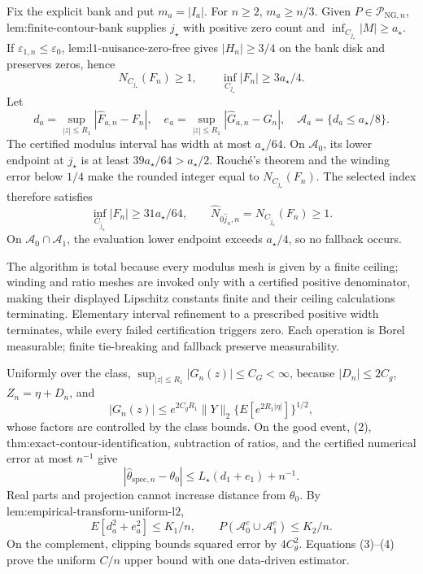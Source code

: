 Fix the explicit bank and put \(m_a=|I_a|\).  For \(n\ge2\), \(m_a\ge n/3\).  Given \(P\in\mathcal P_{\mathrm{NG},n}\), \(\text{lem:finite-contour-bank}\) supplies \(j_\star\) with positive zero count and \(\inf_{C_{j_\star}}|M|\ge a_\star\).  If \(\varepsilon_{1,n}\le\varepsilon_0\), \(\text{lem:l1-nuisance-zero-free}\) gives \(|H_n|\ge3/4\) on the bank disk and preserves zeros, hence
\[
 N_{C_{j_\star}}(F_n)\ge1,
 \qquad \inf_{C_{j_\star}}|F_n|\ge3a_\star/4. \tag{1}
\]
Let
\[
 d_a=\sup_{|z|\le R_1}|\widehat F_{a,n}-F_n|,
 \quad e_a=\sup_{|z|\le R_1}|\widehat G_{a,n}-G_n|,
 \quad \mathcal A_a=\{d_a\le a_\star/8\}.
\]
The certified modulus interval has width at most \(a_\star/64\).  On \(\mathcal A_0\), its lower endpoint at \(j_\star\) is at least \(39a_\star/64>a_\star/2\).  Rouch\'e's theorem and the winding error below \(1/4\) make the rounded integer equal to \(N_{C_{j_\star}}(F_n)\).  The selected index therefore satisfies
\[
 \inf_{C_{\widehat j_n}}|F_n|\ge31a_\star/64,
 \qquad \widehat N_{0\widehat j_n,n}=N_{C_{\widehat j_n}}(F_n)\ge1. \tag{2}
\]
On \(\mathcal A_0\cap\mathcal A_1\), the evaluation lower endpoint exceeds \(a_\star/4\), so no fallback occurs.

The algorithm is total because every modulus mesh is given by a finite ceiling; winding and ratio meshes are invoked only with a certified positive denominator, making their displayed Lipschitz constants finite and their ceiling calculations terminating.  Elementary interval refinement to a prescribed positive width terminates, while every failed certification triggers zero.  Each operation is Borel measurable; finite tie-breaking and fallback preserve measurability.

Uniformly over the class, \(\sup_{|z|\le R_1}|G_n(z)|\le C_G<\infty\), because \(|D_n|\le2C_g\), \(Z_n=\eta+D_n\), and
\[
 |G_n(z)|\le e^{2C_gR_1}\|Y\|_2\{E[e^{2R_1|\eta|}]\}^{1/2},
\]
whose factors are controlled by the class bounds.  On the good event, (2), \(\text{thm:exact-contour-identification}\), subtraction of ratios, and the certified numerical error at most \(n^{-1}\) give
\[
 |\widehat\theta_{\mathrm{spec},n}-\theta_0|
 \le L_\star(d_1+e_1)+n^{-1}. \tag{3}
\]
Real parts and projection cannot increase distance from \(\theta_0\).  By \(\text{lem:empirical-transform-uniform-l2}\),
\[
 E[d_a^2+e_a^2]\le K_1/n,
 \qquad P(\mathcal A_0^c\cup\mathcal A_1^c)\le K_2/n. \tag{4}
\]
On the complement, clipping bounds squared error by \(4C_\theta^2\).  Equations (3)--(4) prove the uniform \(C/n\) upper bound with one data-driven estimator.


